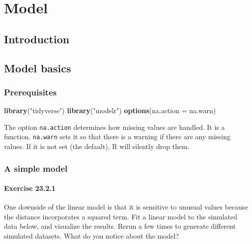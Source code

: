 \documentclass[]{book}
\newenvironment{Shaded}{\begin{snugshade}}{\end{snugshade}}
\newcommand{\DataTypeTok}[1]{\textcolor[rgb]{0.13,0.29,0.53}{#1}}
\newcommand{\KeywordTok}[1]{\textcolor[rgb]{0.13,0.29,0.53}{\textbf{#1}}}
\newcommand{\NormalTok}[1]{#1}
\newcommand{\StringTok}[1]{\textcolor[rgb]{0.31,0.60,0.02}{#1}}
\theoremstyle{plain}
\theoremstyle{remark}
\begin{document}
\hypertarget{part-model}{%
\part{Model}\label{part-model}}

\hypertarget{model-intro}{%
\chapter{Introduction}\label{model-intro}}

\hypertarget{model-basics}{%
\chapter{Model basics}\label{model-basics}}

\hypertarget{prerequisites-1}{%
\section{Prerequisites}\label{prerequisites-1}}

\begin{Shaded}
\begin{Highlighting}[]
\KeywordTok{library}\NormalTok{(}\StringTok{"tidyverse"}\NormalTok{)}
\KeywordTok{library}\NormalTok{(}\StringTok{"modelr"}\NormalTok{)}
\KeywordTok{options}\NormalTok{(}\DataTypeTok{na.action =}\NormalTok{ na.warn)}
\end{Highlighting}
\end{Shaded}

The option \texttt{na.action} determines how missing values are handled.
It is a function. \texttt{na.warn} sets it so that there is a warning if
there are any missing values. If it is not set (the default), R will
silently drop them.

\hypertarget{a-simple-model}{%
\section{A simple model}\label{a-simple-model}}

\hypertarget{exercise-23.2.1}{%
\subsection*{\texorpdfstring{Exercise
{23.2.1}}{Exercise 23.2.1}}\label{exercise-23.2.1}}

One downside of the linear model is that it is sensitive to unusual
values because the distance incorporates a squared term. Fit a linear
model to the simulated data below, and visualize the results. Rerun a
few times to generate different simulated datasets. What do you notice
about the model?
\end{document}
